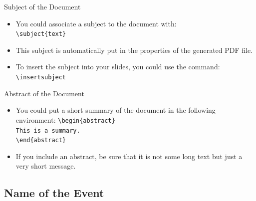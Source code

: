 \documentclass[english,sectioncirclenumberstyle]{ciadbeamer}
\begin{document}
\begin{frame}{Subject of the Document}
	\begin{itemize}
	\item You could associate a subject to the document with: \\
		\texttt{{\textbackslash}subject\{text\}}
	\vspace{1em}
	\item This subject is automatically put in the properties of the generated PDF file.
	\vspace{1em}
	\item To insert the subject into your slides, you could use the command: \\
			\texttt{{\textbackslash}insertsubject}
	\end{itemize}
	\begin{example}
		\insertsubject
	\end{example}
\end{frame}

\begin{frame}{Abstract of the Document}
	\begin{itemize}
	\item You could put a short summary of the document in the following environment:
		\texttt{{\textbackslash}begin\{abstract\}} \\
		\texttt{This is a summary.} \\
		\texttt{{\textbackslash}end\{abstract\}}
	\vspace{1em}
	\begin{abstract}
		This is a summary.
	\end{abstract}
	\item If you include an abstract, be sure that it is not some long text but just a very short message.
	\end{itemize}
\end{frame}

\subsection{Name of the Event}
\end{document}
